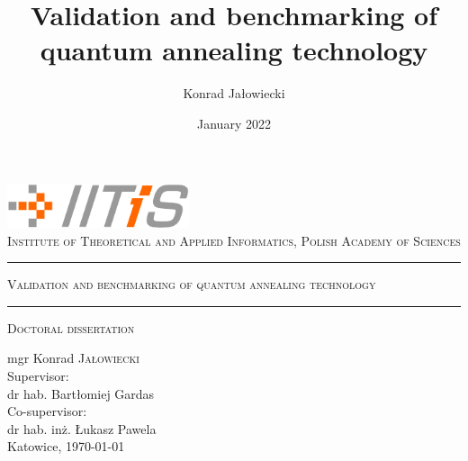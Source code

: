 \documentclass[11pt,dvipsnames,twoside,openright]{memoir}
\title{Validation and benchmarking of quantum annealing technology}
\author{Konrad Jałowiecki}
\date{January 2022}
\theoremstyle{definition}
\begin{document}
\begin{titlingpage}
  \begin{center}
    \includegraphics[width=0.4\textwidth]{figures/iitis_logo}\\
    \vspace{0.5em}
    \textsc{\large Institute of Theoretical and Applied Informatics, Polish Academy of Sciences}
    \vspace*{1in}
    \hrule
    \vspace*{0.5em}
    \textsc{\huge Validation and benchmarking of quantum annealing technology}
    \vspace*{0.5em}
    \hrule
    \vspace*{1em}
    \textsc{\large Doctoral dissertation}
    \par
    \vspace{1.5in}
    {\large mgr Konrad \textsc{Jałowiecki}}\\
    \vspace{0.25in}
    Supervisor:\\ dr hab. Bartłomiej Gardas\\
    \vspace{0.25in}
    Co-supervisor:\\ dr hab. inż. Łukasz Pawela\\
    \vfill
    {Katowice, \today}
  \end{center}
\end{titlingpage}
\end{document}
